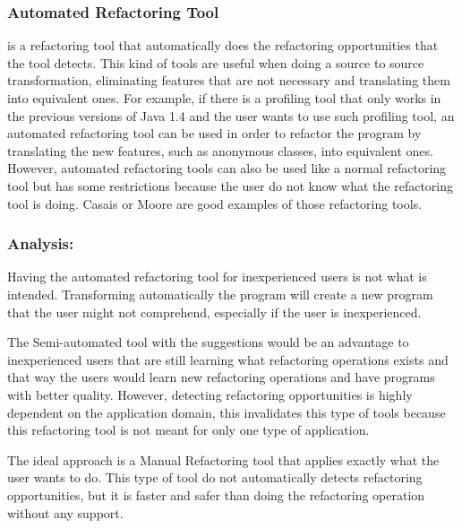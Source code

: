 \subsubsection{Automated Refactoring Tool}
is a refactoring tool that automatically does the refactoring opportunities that the tool detects. 
This kind of tools are useful when doing a source to source transformation, eliminating features that are not necessary and translating them into equivalent ones. 
For example, if there is a profiling tool that only works in the previous versions of Java 1.4 and the user wants to use such profiling tool, an automated refactoring tool can be used in order to refactor the program by translating the new features, such as anonymous classes, into equivalent ones.
However, automated refactoring tools can also be used like a normal refactoring tool but has some restrictions because the user do not know what the refactoring tool is doing.
Casais \cite{casais1994automatic} or Moore \cite{moore1996automatic} are good examples of those refactoring tools.





\subsubsection{Analysis:}
Having the automated refactoring tool for inexperienced users is not what is intended. 
Transforming automatically the program will create a new program that the user might not comprehend, especially if the user is inexperienced.

The Semi-automated tool with the suggestions would be an advantage to inexperienced users that are still learning what refactoring operations exists and that way the users would learn new refactoring operations and have programs with better quality.
However, detecting refactoring opportunities is highly dependent on the application domain, this invalidates this type of tools because this refactoring tool is not meant for only one type of application.

The ideal approach is a Manual Refactoring tool that applies exactly what the user wants to do. 
This type of tool do not automatically detects refactoring opportunities, but it is faster and safer than doing the refactoring operation without any support.